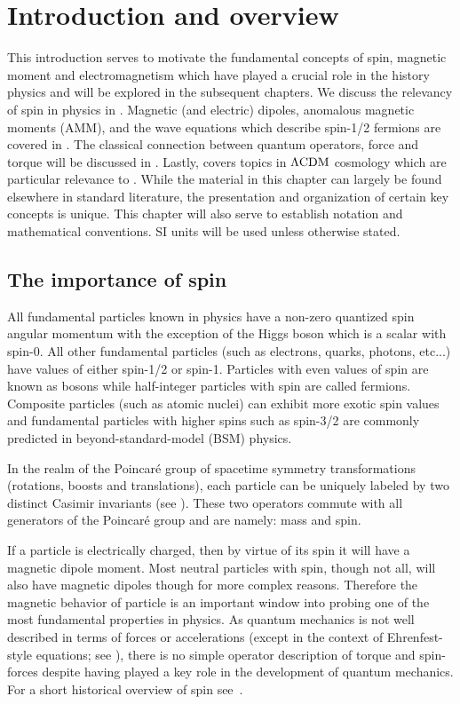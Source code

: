 \chapter{Introduction and overview}
\label{chap:intro}
This introduction serves to motivate the fundamental concepts of spin, magnetic moment and electromagnetism which have played a crucial role in the history physics and will be explored in the subsequent chapters. We discuss the relevancy of spin in physics in . Magnetic (and electric) dipoles, anomalous magnetic moments (AMM), and the wave equations which describe spin-1/2 fermions are covered in . The classical connection between quantum operators, force and torque will be discussed in . Lastly,  covers topics in $\Lambda{\rm CDM}$ cosmology which are particular relevance to . While the material in this chapter can largely be found elsewhere in standard literature, the presentation and organization of certain key concepts is unique. This chapter will also serve to establish notation and mathematical conventions. SI units will be used unless otherwise stated.

\section{The importance of spin}
\label{sec:qspin}
\noindent All fundamental particles known in physics have a non-zero quantized spin angular momentum with the exception of the Higgs boson which is a scalar with spin-0. All other fundamental particles (such as electrons, quarks, photons, etc...) have values of either spin-1/2 or spin-1. Particles with even values of spin are known as bosons while half-integer particles with spin are called fermions. Composite particles (such as atomic nuclei) can exhibit more exotic spin values and fundamental particles with higher spins such as spin-3/2 are commonly predicted in beyond-standard-model (BSM) physics.

In the realm of the Poincar{\'e} group of spacetime symmetry transformations (rotations, boosts and translations), each particle can be uniquely labeled by two distinct Casimir invariants (see ). These two operators commute with all generators of the Poincar{\'e} group and are namely: mass and spin.

If a particle is electrically charged, then by virtue of its spin it will have a magnetic dipole moment. Most neutral particles with spin, though not all, will also have magnetic dipoles though for more complex reasons. Therefore the magnetic behavior of particle is an important window into probing one of the most fundamental properties in physics. As quantum mechanics is not well described in terms of forces or accelerations (except in the context of Ehrenfest-style equations; see ), there is no simple operator description of torque and spin-forces despite having played a key role in the development of quantum mechanics. For a short historical overview of spin see~\cite{ohanian1986spin}.

